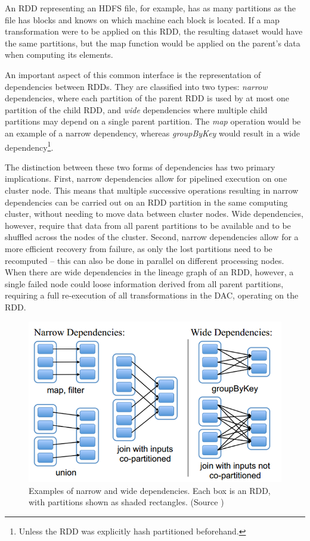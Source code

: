 \documentclass{l4proj}
\begin{document}
An RDD representing an HDFS file, for example, has as many partitions as the file has blocks and knows on which machine each block is located. If a map transformation were to be applied on this RDD, the resulting dataset would have the same partitions, but the map function would be applied on the parent's data when computing its elements.

An important aspect of this common interface is the representation of dependencies between RDDs. They are classified into two types: \textit{narrow} dependencies, where each partition of the parent RDD is used by at most one partition of the child RDD, and \textit{wide} dependencies where multiple child partitions may depend on a single parent partition\cite{RDD}. The \textit{map} operation would be an example of a narrow dependency, whereas \textit{groupByKey} would result in a wide dependency\footnote{Unless the RDD was explicitly hash partitioned beforehand.}.

The distinction between these two forms of dependencies has two primary implications. First, narrow dependencies allow for pipelined execution on one cluster node. This means that multiple successive operations resulting in narrow dependencies can be carried out on an RDD partition in the same computing cluster, without needing to move data between cluster nodes. Wide dependencies, however, require that data from all parent partitions to be available and to be shuffled across the nodes of the cluster. Second, narrow dependencies allow for a more efficient recovery from failure, as only the lost partitions need to be recomputed -- this can also be done in parallel on different processing nodes. When there are wide dependencies in the lineage graph of an RDD, however, a single failed node could loose information derived from all parent partitions, requiring a full re-execution of all transformations in the DAC, operating on the RDD.

\begin{figure}[H]
\includegraphics[width=1.0\textwidth]{images/rdd_dependency}
\caption{Examples  of  narrow  and  wide  dependencies.  Each box is an RDD, with partitions shown as shaded rectangles. (Source \cite{RDD})}
\label{RDD dependencies}
\end{figure}
\end{document}
